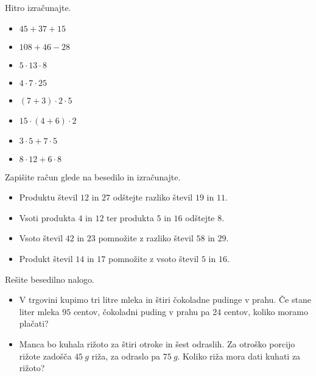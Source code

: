  
     \begin{naloga}
        Hitro izračunajte.
        \begin{itemize}
            \item $45+37+15$ 
            \item $108+46-28$
            \item $5\cdot 13\cdot 8$
            \item $4\cdot 7\cdot 25$
            \item $(7+3)\cdot 2\cdot 5$
            \item $15\cdot(4+6)\cdot 2$
            \item $3\cdot 5+7\cdot 5$
            \item $8\cdot 12+6\cdot 8$
        \end{itemize}
     \end{naloga}
 

 
     \begin{naloga}
        Zapišite račun glede na besedilo in izračunajte.
        \begin{itemize}
            \item Produktu števil $12$ in $27$ odštejte razliko števil $19$ in $11$. 
            \item Vsoti produkta $4$ in $12$ ter produkta $5$ in $16$ odštejte $8$. 
            \item Vsoto števil $42$ in $23$ pomnožite z razliko števil $58$ in $29$. 
            \item Produkt števil $14$ in $17$ pomnožite z vsoto števil $5$ in $16$. 
        \end{itemize}
     \end{naloga}
 

 
     \begin{naloga}
        Rešite besedilno nalogo.
        \begin{itemize}
            \item V trgovini kupimo tri litre mleka in štiri čokoladne pudinge v prahu. Če stane liter mleka $95$ centov,
                čokoladni puding v prahu pa $24$ centov, koliko moramo plačati? 
            \item Manca bo kuhala rižoto za štiri otroke in šest odraslih. Za otroško porcijo rižote zadošča $45~g$ riža,
                za odraslo pa $75~g$. Koliko riža mora dati kuhati za rižoto? 
        \end{itemize}
     \end{naloga}
 


